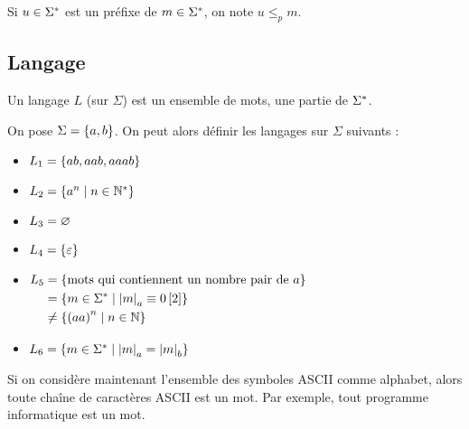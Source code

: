 \begin{nota}
Si \(u\in\Sigma^{*}\) est un préfixe de \(m\in\Sigma^{*}\), on note \(u\leq_pm\).
\end{nota}

\subsection{Langage}

\begin{defi}
Un langage \(L\) (sur \(\Sigma\)) est un ensemble de mots, \ie une partie de \(\Sigma^{*}\).
\end{defi}

\begin{ex}
On pose \(\Sigma=\left\lbrace a,b\right\rbrace\). On peut alors définir les langages sur \(\Sigma\) suivants :

\begin{itemize}
    \item \(L_1=\left\lbrace ab,aab,aaab\right\rbrace\) \\
    \item \(L_2=\left\lbrace a^n\;\middle|\; n\in\mathbb{N}^*\right\rbrace\) \\
    \item \(L_3=\varnothing\) \\
    \item \(L_4=\left\lbrace\varepsilon\right\rbrace\) \\
    \item \(L_5\begin{aligned}[t]
        &=\left\lbrace\text{mots qui contiennent un nombre pair de }a\right\rbrace \\
        &=\left\lbrace m\in\Sigma^{*}\;\middle|\;\left\lvert m\right\rvert_a\equiv0\left[2\right]\right\rbrace \\
        &\not=\left\lbrace\left(aa\right)^n\;\middle|\; n\in\mathbb{N}\right\rbrace
    \end{aligned}\) \\
    \item \(L_6=\left\lbrace m\in\Sigma^{*}\;\middle|\;\left\lvert m\right\rvert_a=\left\lvert m\right\rvert_b\right\rbrace\)
\end{itemize}

Si on considère maintenant l'ensemble des symboles ASCII comme alphabet, alors toute chaîne de caractères ASCII est un mot. Par exemple, tout programme informatique est un mot.
\end{ex}

